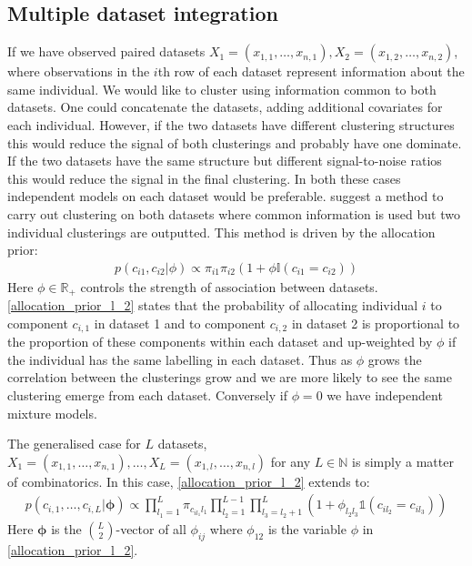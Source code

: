 \documentclass[11pt]{article} %
\begin{document}
	\subsection{Multiple dataset integration}
	If we have observed paired datasets $X_1 = (x_{1,1},\ldots,x_{n,1}), X_2 = (x_{1,2},\ldots,x_{n,2})$, where observations in the $i$th row of each dataset represent information about the same individual. We would like to cluster using information common to both datasets. One could concatenate the datasets, adding additional covariates for each individual. However, if the two datasets have different clustering structures this would reduce the signal of both clusterings and probably have one dominate. If the two datasets have the same structure but different signal-to-noise ratios this would reduce the signal in the final clustering. In both these cases independent models on each dataset would be preferable. \citet{kirk_bayesian_2012} suggest a method to carry out clustering on both datasets where common information is used but two individual clusterings are outputted. This method is driven by the allocation prior:
	\begin{align} \label{allocation_prior_l_2}
	p(c_{i1}, c_{i2} | \phi ) \propto \pi_{i1} \pi_{i2} (1 + \phi \mathbb{I}(c_{i1} = c_{i2}))
	\end{align}
	Here $\phi \in \mathbb{R}_+$ controls the strength of association between datasets. \eqref{allocation_prior_l_2} states that the probability of allocating individual $i$ to component $c_{i,1}$ in dataset 1 and to component $c_{i,2}$ in dataset 2 is proportional to the proportion of these components within each dataset and up-weighted by $\phi$ if the individual has the same labelling in each dataset. Thus as $\phi$ grows the correlation between the clusterings grow and we are more likely to see the same clustering emerge from each dataset. Conversely if $\phi = 0$ we have independent mixture models. 
	
	The generalised case for $L$ datasets, $X_1 = (x_{1,1},\ldots,x_{n,1}),\ldots, X_L = (x_{1,l},\ldots,x_{n,l})$ for any $L \in \mathbb{N}$ is simply a matter of combinatorics. In this case, \eqref{allocation_prior_l_2} extends to:
	\begin{align} \label{allocation_prior}
	p(c_{i,1},\ldots,c_{i,L} | \boldsymbol{\phi}) \propto \prod_{l_1=1}^L\pi_{c_{il_1}l_1}\prod_{l_2=1}^{L-1}\prod_{l_3=l_2+1}^L\left(1+\phi_{l_2l_3}\mathbb{1}(c_{il_2} = c_{il_3}) \right)
	\end{align}
	Here $\boldsymbol{\phi}$ is the ${L \choose 2}$-vector of all $\phi_{ij}$ where $\phi_{12}$ is the variable $\phi$ in \eqref{allocation_prior_l_2}.
	
\end{document}
